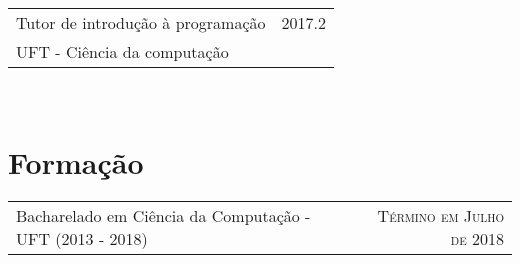 \documentclass[a4paper,10pt]{article}
\begin{document}
\begin{tabular}{p{11cm}|r}
  Tutor de introdução à programação & \textsc{2017.2} \\
  UFT - Ciência da computação & \\
\end{tabular}\\



\section{Formação}

\begin{tabular}{p{11cm}|r}
  Bacharelado em Ciência da Computação - UFT (2013 - 2018) & \textsc{Término em Julho de 2018} \\
\end{tabular}\\


\end{document}
